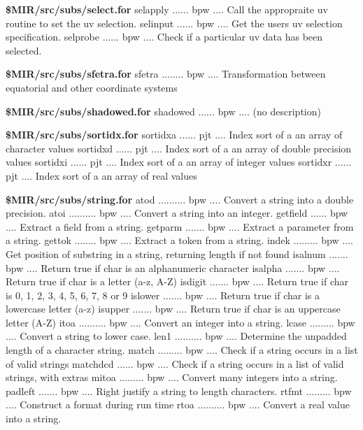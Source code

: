 \par{\bf \$MIR/src/subs/select.for}
{\eightpoint\begintt
selapply ...... bpw .... Call the appropraite uv routine to set the uv selection.
selinput ...... bpw .... Get the users uv selection specification.
selprobe ...... bpw .... Check if a particular uv data has been selected.
\endtt}
\par{\bf \$MIR/src/subs/sfetra.for}
{\eightpoint\begintt
sfetra ........ bpw .... Transformation between equatorial and other coordinate systems
\endtt}
\par{\bf \$MIR/src/subs/shadowed.for}
{\eightpoint\begintt
shadowed ...... bpw .... (no description)
\endtt}
\par{\bf \$MIR/src/subs/sortidx.for}
{\eightpoint\begintt
sortidxa ...... pjt .... Index sort of a an array of character values
sortidxd ...... pjt .... Index sort of a an array of double precision values
sortidxi ...... pjt .... Index sort of a an array of integer values
sortidxr ...... pjt .... Index sort of a an array of real values
\endtt}
\par{\bf \$MIR/src/subs/string.for}
{\eightpoint\begintt
atod .......... bpw .... Convert a string into a double precision.
atoi .......... bpw .... Convert a string into an integer.
getfield ...... bpw .... Extract a field from a string.
getparm ....... bpw .... Extract a parameter from a string.
gettok ........ bpw .... Extract a token from a string.
\endtt}
{\eightpoint\begintt
indek ......... bpw .... Get position of substring in a string, returning length if not found
isalnum ....... bpw .... Return true if char is an alphanumeric character
isalpha ....... bpw .... Return true if char is a letter (a-z, A-Z)
isdigit ....... bpw .... Return true if char is 0, 1, 2, 3, 4, 5, 6, 7, 8 or 9
islower ....... bpw .... Return true if char is a lowercase letter (a-z)
\endtt}
{\eightpoint\begintt
isupper ....... bpw .... Return true if char is an uppercase letter (A-Z)
itoa .......... bpw .... Convert an integer into a string.
lcase ......... bpw .... Convert a string to lower case.
len1 .......... bpw .... Determine the unpadded length of a character string.
match ......... bpw .... Check if a string occurs in a list of valid strings
\endtt}
{\eightpoint\begintt
matchdcd ...... bpw .... Check if a string occurs in a list of valid strings, with extras
mitoa ......... bpw .... Convert many integers into a string.
padleft ....... bpw .... Right justify a string to length characters.
rtfmt ......... bpw .... Construct a format during run time
rtoa .......... bpw .... Convert a real value into a string.
\endtt}
